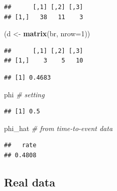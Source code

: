 \documentclass[12pt,]{book}
\newenvironment{Shaded}{\begin{snugshade}}{\end{snugshade}}
\newcommand{\CommentTok}[1]{\textcolor[rgb]{0.56,0.35,0.01}{\textit{#1}}}
\newcommand{\DataTypeTok}[1]{\textcolor[rgb]{0.13,0.29,0.53}{#1}}
\newcommand{\DecValTok}[1]{\textcolor[rgb]{0.00,0.00,0.81}{#1}}
\newcommand{\KeywordTok}[1]{\textcolor[rgb]{0.13,0.29,0.53}{\textbf{#1}}}
\newcommand{\NormalTok}[1]{#1}
\newcommand{\OperatorTok}[1]{\textcolor[rgb]{0.81,0.36,0.00}{\textbf{#1}}}
\newcommand{\StringTok}[1]{\textcolor[rgb]{0.31,0.60,0.02}{#1}}
\begin{document}
\begin{verbatim}
##      [,1] [,2] [,3]
## [1,]   38   11    3
\end{verbatim}

\begin{Shaded}
\begin{Highlighting}[]
\NormalTok{(d <-}\StringTok{ }\KeywordTok{matrix}\NormalTok{(br, }\DataTypeTok{nrow=}\DecValTok{1}\NormalTok{))}
\end{Highlighting}
\end{Shaded}

\begin{verbatim}
##      [,1] [,2] [,3]
## [1,]    3    5   10
\end{verbatim}

\begin{Shaded}
\end{Shaded}

\begin{verbatim}
## [1] 0.4683
\end{verbatim}

\begin{Shaded}
\begin{Highlighting}[]
\NormalTok{phi }\CommentTok{# setting}
\end{Highlighting}
\end{Shaded}

\begin{verbatim}
## [1] 0.5
\end{verbatim}

\begin{Shaded}
\begin{Highlighting}[]
\NormalTok{phi_hat }\CommentTok{# from time-to-event data}
\end{Highlighting}
\end{Shaded}

\begin{verbatim}
##   rate 
## 0.4808
\end{verbatim}

\hypertarget{real-data}{%
\subsection{Real data}\label{real-data}}
\end{document}
